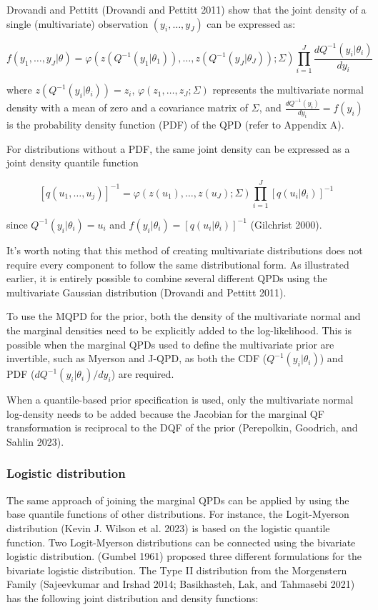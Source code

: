 \documentclass[
]{interact}
\begin{document}
Drovandi and Pettitt (Drovandi and Pettitt 2011) show that the joint
density of a single (multivariate) observation \((y_i,\dots,y_J)\) can
be expressed as:

\[
f(y_1,\dots,y_J\vert\theta)=\varphi(z(Q^{-1}(y_1\vert\theta_1)),\dots,z(Q^{-1}(y_J\vert\theta_J));\Sigma)\prod_{i=1}^{J}\frac{dQ^{-1}(y_i\vert\theta_i)}{dy_i}
\]

where \(z(Q^{-1}(y_i\vert\theta_i))=z_i\),
\(\varphi(z_1,\dots,z_J;\Sigma)\) represents the multivariate normal
density with a mean of zero and a covariance matrix of \(\Sigma\), and
\(\frac{dQ^{-1}(y_i)}{dy_i}=f(y_i)\) is the probability density function
(PDF) of the QPD (refer to Appendix A).

For distributions without a PDF, the same joint density can be expressed
as a joint density quantile function

\[
[q(u_1,\dots,u_j)]^{-1}=\varphi(z(u_1),\dots,z(u_J);\Sigma)\prod_{i=1}^{J}[q(u_i\vert\theta_i)]^{-1}
\]

since \(Q^{-1}(y_i\vert\theta_i)=u_i\) and
\(f(y_i\vert\theta_i)=[q(u_i\vert\theta_i)]^{-1}\) (Gilchrist 2000).

It's worth noting that this method of creating multivariate
distributions does not require every component to follow the same
distributional form. As illustrated earlier, it is entirely possible to
combine several different QPDs using the multivariate Gaussian
distribution (Drovandi and Pettitt 2011).

To use the MQPD for the prior, both the density of the multivariate
normal and the marginal densities need to be explicitly added to the
log-likelihood. This is possible when the marginal QPDs used to define
the multivariate prior are invertible, such as Myerson and J-QPD, as
both the CDF (\(Q^{-1}(y_i\vert\theta_i)\)) and PDF
(\(dQ^{-1}(y_i\vert\theta_i)/dy_i\)) are required.

When a quantile-based prior specification is used, only the multivariate
normal log-density needs to be added because the Jacobian for the
marginal QF transformation is reciprocal to the DQF of the prior
(Perepolkin, Goodrich, and Sahlin 2023).

\subsubsection{Logistic distribution}\label{logistic-distribution}

The same approach of joining the marginal QPDs can be applied by using
the base quantile functions of other distributions. For instance, the
Logit-Myerson distribution (Kevin J. Wilson et al. 2023) is based on the
logistic quantile function. Two Logit-Myerson distributions can be
connected using the bivariate logistic distribution. (Gumbel 1961)
proposed three different formulations for the bivariate logistic
distribution. The Type II distribution from the Morgenstern Family
(Sajeevkumar and Irshad 2014; Basikhasteh, Lak, and Tahmasebi 2021) has
the following joint distribution and density functions:
\end{document}
